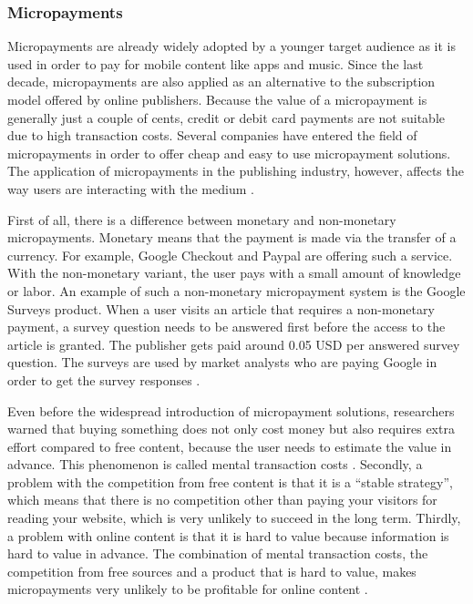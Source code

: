 \subsubsection{Micropayments}
Micropayments are already widely adopted by a younger target audience as it is used in order to pay for mobile content like apps and music. Since the last decade, micropayments are also applied as an alternative to the subscription model offered by online publishers. Because the value of a micropayment is generally just a couple of cents, credit or debit card payments are not suitable due to high transaction costs. Several companies have entered the field of micropayments in order to offer cheap and easy to use micropayment solutions. The application of micropayments in the publishing industry, however, affects the way users are interacting with the medium \cite{geidner2015effects}.

First of all, there is a difference between monetary and non-monetary micropayments. Monetary means that the payment is made via the transfer of a currency. For example, Google Checkout and Paypal are offering such a service. With the non-monetary variant, the user pays with a small amount of knowledge or labor. An example of such a non-monetary micropayment system is the Google Surveys product. When a user visits an article that requires a non-monetary payment, a survey question needs to be answered first before the access to the article is granted. The publisher gets paid around 0.05 USD per answered survey question. The surveys are used by market analysts who are paying Google in order to get the survey responses \cite{googlesurveys}.

Even before the widespread introduction of micropayment solutions, researchers warned that buying something does not only cost money but also requires extra effort compared to free content, because the user needs to estimate the value in advance. This phenomenon is called mental transaction costs \cite{szabo, shirky, oh2016free}. Secondly, a problem with the competition from free content is that it is a ``stable strategy'', which means that there is no competition other than paying your visitors for reading your website, which is very unlikely to succeed in the long term. Thirdly, a problem with online content is that it is hard to value because information is hard to value in advance. The combination of mental transaction costs, the competition from free sources and a product that is hard to value, makes micropayments very unlikely to be profitable for online content \cite{shirky}.

